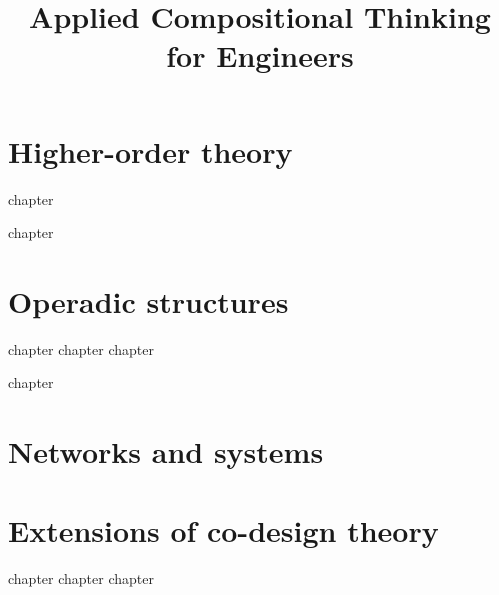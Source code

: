 

\title{Applied Compositional Thinking\\ for Engineers}
\date{}
\frontmatter

\tableofcontents
\mainmatter
\addtocounter{part}{8}
\addtocounter{chapter}{38}


\part{Higher-order theory}\label{part:higher-order}




{chapter}

{chapter}


\part{Operadic structures}\label{part:operads}


{chapter}
{chapter}
{chapter}

{chapter}


\part{Networks and systems}\label{part:networks}

\chapter{}


\part{Extensions of co-design theory}
{chapter}
{chapter}
{chapter}

\backmatter

\printbibliography
%
%

\printindex

%
%
%
%
%
%
